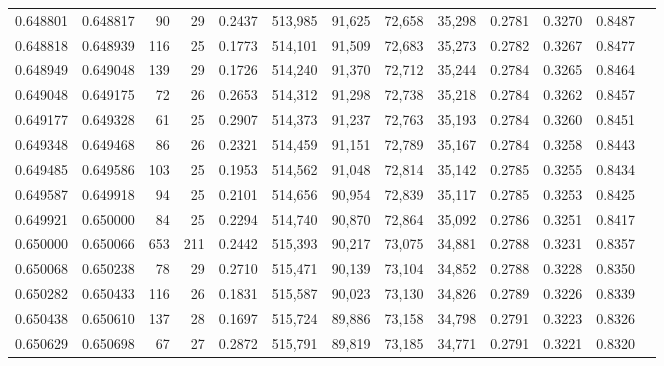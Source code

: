 \begin{tabular}{rrrrrrrrrrrrr}
0.648801 & 0.648817 &     90 &    29 &                                     0.2437 & 513,985 &  91,625 &  72,658 &  35,298 & 0.2781 & 0.3270 & 0.8487 \\
0.648818 & 0.648939 &    116 &    25 &                                     0.1773 & 514,101 &  91,509 &  72,683 &  35,273 & 0.2782 & 0.3267 & 0.8477 \\
0.648949 & 0.649048 &    139 &    29 &                                     0.1726 & 514,240 &  91,370 &  72,712 &  35,244 & 0.2784 & 0.3265 & 0.8464 \\
0.649048 & 0.649175 &     72 &    26 &                                     0.2653 & 514,312 &  91,298 &  72,738 &  35,218 & 0.2784 & 0.3262 & 0.8457 \\
0.649177 & 0.649328 &     61 &    25 &                                     0.2907 & 514,373 &  91,237 &  72,763 &  35,193 & 0.2784 & 0.3260 & 0.8451 \\
0.649348 & 0.649468 &     86 &    26 &                                     0.2321 & 514,459 &  91,151 &  72,789 &  35,167 & 0.2784 & 0.3258 & 0.8443 \\
0.649485 & 0.649586 &    103 &    25 &                                     0.1953 & 514,562 &  91,048 &  72,814 &  35,142 & 0.2785 & 0.3255 & 0.8434 \\
0.649587 & 0.649918 &     94 &    25 &                                     0.2101 & 514,656 &  90,954 &  72,839 &  35,117 & 0.2785 & 0.3253 & 0.8425 \\
0.649921 & 0.650000 &     84 &    25 &                                     0.2294 & 514,740 &  90,870 &  72,864 &  35,092 & 0.2786 & 0.3251 & 0.8417 \\
0.650000 & 0.650066 &    653 &   211 &                                     0.2442 & 515,393 &  90,217 &  73,075 &  34,881 & 0.2788 & 0.3231 & 0.8357 \\
0.650068 & 0.650238 &     78 &    29 &                                     0.2710 & 515,471 &  90,139 &  73,104 &  34,852 & 0.2788 & 0.3228 & 0.8350 \\
0.650282 & 0.650433 &    116 &    26 &                                     0.1831 & 515,587 &  90,023 &  73,130 &  34,826 & 0.2789 & 0.3226 & 0.8339 \\
0.650438 & 0.650610 &    137 &    28 &                                     0.1697 & 515,724 &  89,886 &  73,158 &  34,798 & 0.2791 & 0.3223 & 0.8326 \\
0.650629 & 0.650698 &     67 &    27 &                                     0.2872 & 515,791 &  89,819 &  73,185 &  34,771 & 0.2791 & 0.3221 & 0.8320 \\

\end{tabular}
